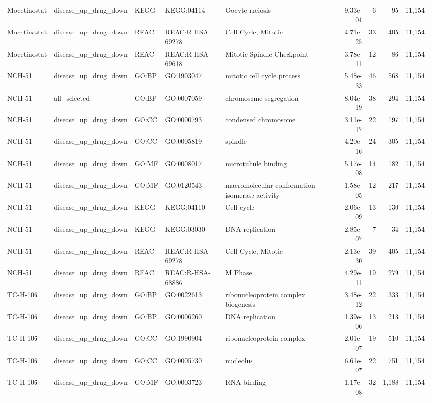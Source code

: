 \begin{landscape}
\begin{longtable}{@{}p{2.0cm}p{3.1cm}p{1.2cm}p{2.2cm}p{6.3cm}rrrr@{}}
Mocetinostat & disease\_up\_drug\_down & KEGG & KEGG:04114 & Oocyte meiosis & 9.33e-04 & 6 & 95 & 11,154 \\
Mocetinostat & disease\_up\_drug\_down & REAC & REAC:R-HSA-69278 & Cell Cycle, Mitotic & 4.71e-25 & 33 & 405 & 11,154 \\
Mocetinostat & disease\_up\_drug\_down & REAC & REAC:R-HSA-69618 & Mitotic Spindle Checkpoint & 3.78e-11 & 12 & 86 & 11,154 \\
NCH-51 & disease\_up\_drug\_down & GO:BP & GO:1903047 & mitotic cell cycle process & 5.48e-33 & 46 & 568 & 11,154 \\
NCH-51 & all\_selected & GO:BP & GO:0007059 & chromosome segregation & 8.04e-19 & 38 & 294 & 11,154 \\
NCH-51 & disease\_up\_drug\_down & GO:CC & GO:0000793 & condensed chromosome & 3.11e-17 & 22 & 197 & 11,154 \\
NCH-51 & disease\_up\_drug\_down & GO:CC & GO:0005819 & spindle & 4.20e-16 & 24 & 305 & 11,154 \\
NCH-51 & disease\_up\_drug\_down & GO:MF & GO:0008017 & microtubule binding & 5.17e-08 & 14 & 182 & 11,154 \\
NCH-51 & disease\_up\_drug\_down & GO:MF & GO:0120543 & macromolecular conformation isomerase activity & 1.58e-05 & 12 & 217 & 11,154 \\
NCH-51 & disease\_up\_drug\_down & KEGG & KEGG:04110 & Cell cycle & 2.06e-09 & 13 & 130 & 11,154 \\
NCH-51 & disease\_up\_drug\_down & KEGG & KEGG:03030 & DNA replication & 2.85e-07 & 7 & 34 & 11,154 \\
NCH-51 & disease\_up\_drug\_down & REAC & REAC:R-HSA-69278 & Cell Cycle, Mitotic & 2.13e-30 & 39 & 405 & 11,154 \\
NCH-51 & disease\_up\_drug\_down & REAC & REAC:R-HSA-68886 & M Phase & 4.29e-11 & 19 & 279 & 11,154 \\
TC-H-106 & disease\_up\_drug\_down & GO:BP & GO:0022613 & ribonucleoprotein complex biogenesis & 3.48e-12 & 22 & 333 & 11,154 \\
TC-H-106 & disease\_up\_drug\_down & GO:BP & GO:0006260 & DNA replication & 1.39e-06 & 13 & 213 & 11,154 \\
TC-H-106 & disease\_up\_drug\_down & GO:CC & GO:1990904 & ribonucleoprotein complex & 2.01e-07 & 19 & 510 & 11,154 \\
TC-H-106 & disease\_up\_drug\_down & GO:CC & GO:0005730 & nucleolus & 6.61e-07 & 22 & 751 & 11,154 \\
TC-H-106 & disease\_up\_drug\_down & GO:MF & GO:0003723 & RNA binding & 1.17e-08 & 32 & 1,188 & 11,154 \\

\end{longtable}
\end{landscape}
